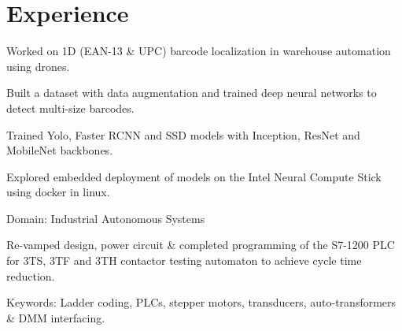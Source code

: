 \documentclass[10pt,letter,sans]{moderncv}        %
\begin{document}
    

\vspace{-2.2em}
\section{Experience}
\vspace{-1.0em}
\begin{itemize} \normalsize{
  
\item[\textbullet] Worked on 1D (EAN-13 \& UPC) barcode localization in warehouse automation using drones.
\item[\textbullet] Built a dataset with data augmentation and trained deep neural networks to detect multi-size barcodes.  
\item[\textbullet] Trained Yolo, Faster RCNN and SSD models with Inception, ResNet and MobileNet backbones.
\item[\textbullet] Explored embedded deployment of models on the Intel Neural Compute Stick using docker in linux.
}
\end{itemize}

\smallskip

\vspace{-1.0em}
\begin{itemize} \normalsize{
  
\item[\textbullet] Domain: Industrial Autonomous Systems
\item[\textbullet] Re-vamped design, power circuit \& completed programming of the S7-1200 PLC for 3TS, 3TF and 3TH contactor testing automaton to achieve cycle time reduction.
\item[\textbullet] Keywords: Ladder coding, PLCs, stepper motors, transducers, auto-transformers \& DMM interfacing.
}

\end{itemize}



\vspace{-0.7em}
\end{document}
